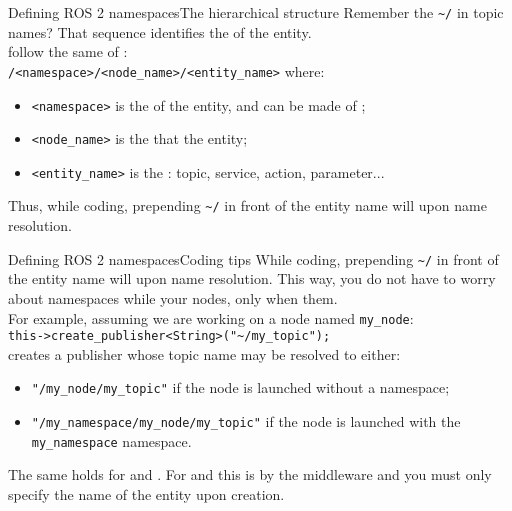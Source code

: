 \begin{frame}{Defining ROS 2 namespaces}{The hierarchical structure}
  Remember the \texttt{\textasciitilde/} in topic names? That sequence identifies the  of the entity.\\
   follow the same  of :\\
  \bigskip
  \texttt{/<namespace>/<node\_name>/<entity\_name>}
  \bigskip
  where:
  \begin{itemize}
    \item \texttt{<namespace>} is the  of the entity, and can be made of ;
    \item \texttt{<node\_name>} is the  that  the entity;
    \item \texttt{<entity\_name>} is the : topic, service, action, parameter...
  \end{itemize}
  Thus, while coding, prepending \texttt{\textasciitilde/} in front of the entity name will  upon name resolution.
\end{frame}
\begin{frame}{Defining ROS 2 namespaces}{Coding tips}
  While coding, prepending \texttt{\textasciitilde/} in front of the entity name will  upon name resolution. This way, you do not have to worry about namespaces while  your nodes, only when  them.\\
  For example, assuming we are working on a node named \texttt{my\_node}:\\
  \bigskip
  \texttt{this->create\_publisher<String>("\textasciitilde/my\_topic");}\\
  \bigskip
  creates a publisher whose topic name may be resolved to either:
  \begin{itemize}
    \item \texttt{"/my\_node/my\_topic"} if the node is launched without a namespace;
    \item \texttt{"/my\_namespace/my\_node/my\_topic"} if the node is launched with the \texttt{my\_namespace} namespace.
  \end{itemize}
  The same holds for  and . For  and  this is  by the middleware and you must only specify the name of the entity upon creation.
\end{frame}
